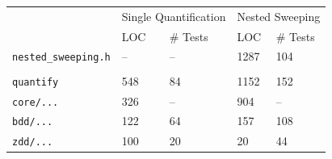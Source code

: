 \documentclass[english, aspectratio=169]{beamer}
\begin{document}
\begin{frame}
  \begin{table}
    \centering
    \begin{tabular}{l||ll|ll}
                                   & \multicolumn{2}{c|}{Single Quantification} & \multicolumn{2}{c}{Nested Sweeping}
      \\
                                   & LOC & \# Tests                              & LOC  & \# Tests
      \\ \hline \hline
      \texttt{nested\_sweeping.h}  & --  & --                                    & 1287 & 104
      \\
                                   &     &                                       &      &
      \\
      \texttt{quantify}            & 548 & 84                                    & 1152 & 152
      \\
      \quad \texttt{core/...}      & 326 & --                                    & 904  & --
      \\
      \quad \texttt{bdd/...}       & 122 & 64                                    & 157  & 108
      \\
      \quad \texttt{zdd/...}       & 100 & 20                                    & 20   & 44
    \end{tabular}
  \end{table}
\end{frame}

\blankframe

\begin{frame}
  \begin{figure}
    \centering

    \begin{tikzpicture}
      
    \end{tikzpicture}
  \end{figure}
\end{frame}
\end{document}
